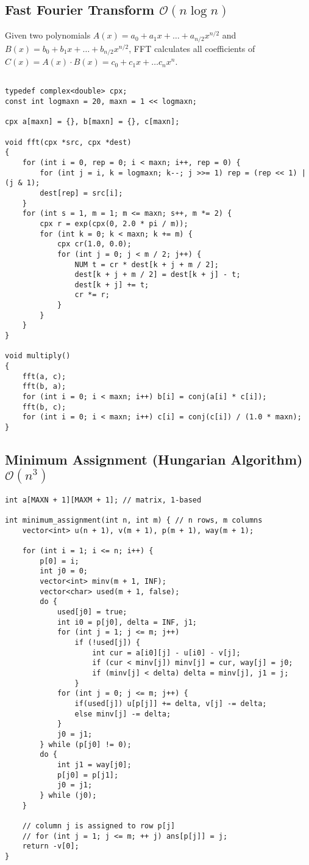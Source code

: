 \documentclass{article}
\begin{document}
\subsection{Fast Fourier Transform $\mathcal{O}(n \log n)$}

Given two polynomials $A(x) = a_0 + a_1 x + \dots + a_{n/2} x^{n/2}$ and $B(x) = b_0 + b_1 x + \dots + b_{n/2} x^{n/2}$, FFT calculates all coefficients of $C(x) = A(x) \cdot B(x) = c_0 + c_1 x + \dots c_{n} x^{n}$.

\begin{lstlisting}

typedef complex<double> cpx;
const int logmaxn = 20, maxn = 1 << logmaxn;

cpx a[maxn] = {}, b[maxn] = {}, c[maxn];

void fft(cpx *src, cpx *dest)
{
	for (int i = 0, rep = 0; i < maxn; i++, rep = 0) {
		for (int j = i, k = logmaxn; k--; j >>= 1) rep = (rep << 1) | (j & 1);
		dest[rep] = src[i];
	}
	for (int s = 1, m = 1; m <= maxn; s++, m *= 2) {
		cpx r = exp(cpx(0, 2.0 * pi / m));
		for (int k = 0; k < maxn; k += m) {
			cpx cr(1.0, 0.0);
			for (int j = 0; j < m / 2; j++) {
				NUM t = cr * dest[k + j + m / 2];
				dest[k + j + m / 2] = dest[k + j] - t;
				dest[k + j] += t;
				cr *= r;
			}
		}
	}
}

void multiply()
{
	fft(a, c);
	fft(b, a);
	for (int i = 0; i < maxn; i++) b[i] = conj(a[i] * c[i]);
	fft(b, c);
	for (int i = 0; i < maxn; i++) c[i] = conj(c[i]) / (1.0 * maxn);
}

\end{lstlisting}

\subsection{Minimum Assignment (Hungarian Algorithm) $\mathcal{O}(n^{3})$}

\begin{lstlisting}
int a[MAXN + 1][MAXM + 1]; // matrix, 1-based

int minimum_assignment(int n, int m) { // n rows, m columns
	vector<int> u(n + 1), v(m + 1), p(m + 1), way(m + 1);

	for (int i = 1; i <= n; i++) {
		p[0] = i;
		int j0 = 0;
		vector<int> minv(m + 1, INF);
		vector<char> used(m + 1, false);
		do {
			used[j0] = true;
			int i0 = p[j0], delta = INF, j1;
			for (int j = 1; j <= m; j++)
				if (!used[j]) {
					int cur = a[i0][j] - u[i0] - v[j];
					if (cur < minv[j]) minv[j] = cur, way[j] = j0;
					if (minv[j] < delta) delta = minv[j], j1 = j;
				}
			for (int j = 0; j <= m; j++) {
				if(used[j]) u[p[j]] += delta, v[j] -= delta;
				else minv[j] -= delta;
			}
			j0 = j1;
		} while (p[j0] != 0);
		do {
			int j1 = way[j0];
			p[j0] = p[j1];
			j0 = j1;
		} while (j0);
	}

	// column j is assigned to row p[j]
	// for (int j = 1; j <= m; ++ j) ans[p[j]] = j;
	return -v[0];
}
\end{lstlisting}
\end{document}
